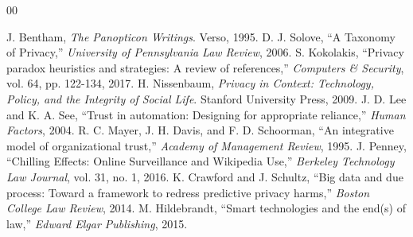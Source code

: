 \documentclass[conference]{IEEEtran}
\begin{document}
\begin{thebibliography}{00}

 J. Bentham, \textit{The Panopticon Writings}. Verso, 1995.
 D. J. Solove, ``A Taxonomy of Privacy,'' \textit{University of Pennsylvania Law Review}, 2006.
 S. Kokolakis, ``Privacy paradox heuristics and strategies: A review of references,'' \textit{Computers \& Security}, vol. 64, pp. 122-134, 2017.
 H. Nissenbaum, \textit{Privacy in Context: Technology, Policy, and the Integrity of Social Life}. Stanford University Press, 2009.
 J. D. Lee and K. A. See, ``Trust in automation: Designing for appropriate reliance,'' \textit{Human Factors}, 2004.
 R. C. Mayer, J. H. Davis, and F. D. Schoorman, ``An integrative model of organizational trust,'' \textit{Academy of Management Review}, 1995.
 J. Penney, ``Chilling Effects: Online Surveillance and Wikipedia Use,'' \textit{Berkeley Technology Law Journal}, vol. 31, no. 1, 2016.
 K. Crawford and J. Schultz, ``Big data and due process: Toward a framework to redress predictive privacy harms,'' \textit{Boston College Law Review}, 2014.
 M. Hildebrandt, ``Smart technologies and the end(s) of law,'' \textit{Edward Elgar Publishing}, 2015.


\end{thebibliography}
\end{document}
